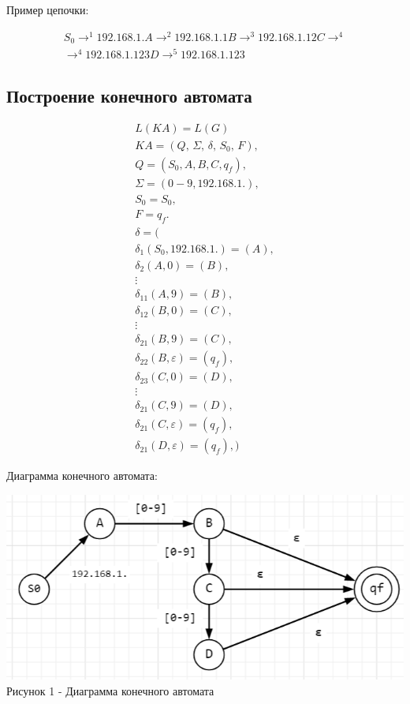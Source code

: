 \documentclass[12pt]{extarticle}
\begin{document}
	\noindent Пример цепочки:
	
	\begin{gather*}
		S_0 \rightarrow ^1 192.168.1.A \rightarrow ^2 192.168.1.1B \rightarrow ^ 3 192.168.1.12C \rightarrow ^ 4 \\ \rightarrow ^ 4 192.168.1.123D \rightarrow ^ 5 192.168.1.123 
	\end{gather*}	
		
	\subsection{Построение конечного автомата}
	
	\begin{gather*}
		L(KA) = L(G) \\
		KA = (Q, \, \Sigma, \, \delta, \, S_0, \, F), \\
		Q = (S_0, A, B, C, q_f), \\
		\Sigma = (0-9, 192.168.1.), \\
		S_0 = S_0, \\
		F = q_f. \\
		\delta = ( \\
			\delta_1(S_0, 192.168.1.) = (A), \\
			\delta_2(A, 0) = (B), \\
			\vdots \\
			\delta_11(A, 9) = (B), \\
			\delta_12(B, 0) = (C), \\
			\vdots \\
			\delta_21(B, 9) = (C), \\
			\delta_22(B, \varepsilon) = (q_f), \\
			\delta_23(C, 0) = (D), \\
			\vdots \\
			\delta_21(C, 9) = (D), \\
			\delta_21(C, \varepsilon) = (q_f), \\
			\delta_21(D, \varepsilon) = (q_f),
		)
	\end{gather*}
	
	\noindent Диаграмма конечного автомата:
	
	\begin{center}
		\includegraphics[scale=0.7]{ka_diagram.png}
		Рисунок 1 - Диаграмма конечного автомата	
	\end{center}
	
\end{document}
